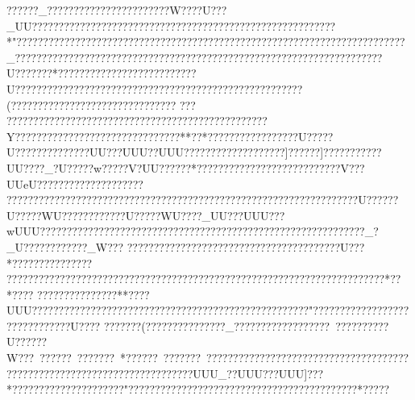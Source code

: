 {{{{{{{{{{{{{{{{{{{{{{{{{{{{{{{{{{{{{{{{{{{{{{{{{{{{{{{{{{{{{{{{{{{{{{{{{{{{{{{{{{{{{{{{{{{{{{{{{{{{{{{{{{{{{{{{{{{{{{{{{{{{{{{{{{{{{{{{{{{{{{{{{{{{{{{{{{{{{{{{{{{{{{{{{{{{{{{{{{{{{{{{{{{{{{{{{{{{{{{{{{{{{{{{{{{{{{{{{{{{{{{{{{{{{{{{{{{{{{{{{{{{{{{{{{{{{{{{{{{{{{{{{{{{{{{{{{{{{{{{{{{{{{{{{{{{{{{{{{{{{{{{{{{{{{{{{{{{{{{{{{{{{{{{{{{{{{{{{{{{{{{{{{{{{{{{{{{{{{{{{{{{{{{{{{{{{{{{{{{{{{{{{{{{{{{{{{{{{{{{{{{{{{{{{{{{{{{{{{{{{{{{{{{{{{{{{{{{{{{{{{{{{{{{{{{{{{{{{{{{{{{{{{{{{{{{{{{{{{{{{{{{{{{{{{{{{{{{{{{{{{{{{{{{{{{{{{{{{{{{{{{{{{{{{{{{{{{{{{{{{{{{{{{{{{{{{{{{{{{{{{{{{{{{{{{{{{{{{{{{{{{{{{{{{{{{{{{{{{{{{{{{{{{{{{{{{{{{{{{{{{{{{{{{{{{{{{{{{{{{{{{{{{{{{{{{{{{{{{{{{{{{{{{{{{{{{{{{{{{{{{{{{{{{{{{{{{{{{{{{{{{{{{{{{{{{{{{{{{{{{{{{{{{{{{{{{{{{{{{{{{{{{{{{{{{{{{{{{{{{{{{{{{{{{{{{{{{{{{{{{{{{{{{{{{{??????_???????????????????????W????U???_UU???  ?????? ????????????????????????????????????????????????*"????  ?????????????????????????????????????????????????????????????????????_?????????????????????????????????????????????????????????????????????U???????*??????????????????????????U?????????????????????????????????????????????????????? (  ????????????   ???????????????????  ???????????????? ????????????????????????????????????Y??????????????????????????????? ** ??*?????????????????U?????U??????????????UU???UUU??UUU???????????????????]??????]???????????UU????_?U?????w???   ??V?UU??????*?????    ????????????????   ??????V???UUeU????   ?????   ?????  ??????  ?????? ??????? ?????????????????????????????????????????????????????U??????U?????WU????????????U?????WU????_UU???UUU???wUUU??   ???  ???? ?????? ??????????????????????????????????????????????_?_U????????????_W??? ???????????????????  ????? ????????????????U???*??????????????????????????????????????????????????????????????????????????????????????*??*???? ? ??????????????**????UUU???? ??????????????????????????????  ??????  ???????? ????   "??????? ??????? ????   ?????   ???????U????
??????? (???????????????_???????????    ????    ???~??????????U??????W???~ ??????~???????~*??????~???????~   ????  ?????????????????????????????????????????????????????????????????   ??    ??UUU_??UUU???UUU]???*?????????????????????  "???? ???????????????????????????????????????*?????   
}}}}}}}}}}}}}}}}}}}}}}}}}}}}}}}}}}}}}}}}}}}}}}}}}}}}}}}}}}}}}}}}}}}}}}}}}}}}}}}}}}}}}}}}}}}}}}}}}}}}}}}}}}}}}}}}}}}}}}}}}}}}}}}}}}}}}}}}}}}}}}}}}}}}}}}}}}}}}}}}}}}}}}}}}}}}}}}}}}}}}}}}}}}}}}}}}}}}}}}}}}}}}}}}}}}}}}}}}}}}}}}}}}}}}}}}}}}}}}}}}}}}}}}}}}}}}}}}}}}}}}}}}}}}}}}}}}}}}}}}}}}}}}}}}}}}}}}}}}}}}}}}}}}}}}}}}}}}}}}}}}}}}}}}}}}}}}}}}}}}}}}}}}}}}}}}}}}}}}}}}}}}}}}}}}}}}}}}}}}}}}}}}}}}}}}}}}}}}}}}}}}}}}}}}}}}}}}}}}}}}}}}}}}}}}}}}}}}}}}}}}}}}}}}}}}}}}}}}}}}}}}}}}}}}}}}}}}}}}}}}}}}}}}}}}}}}}}}}}}}}}}}}}}}}}}}}}}}}}}}}}}}}}}}}}}}}}}}}}}}}}}}}}}}}}}}}}}}}}}}}}}}}}}}}}}}}}}}}}}}}}}}}}}}}}}}}}}}}}}}}}}}}}}}}}}}}}}}}}}}}}}}}}}}}}}}}}}}}}}}}}}}}}}}}}}}}}}}}}}}}}}}}}}}}}}}}}}}}}}}}}}}}}}}}}}}}}}}}}}}}}}}}}}}}}}}}}}}}}}}}}}}}}}}}}}}}}}}}}}}}}}}}}}}}}}}}}}}}}}}}}}}}}}}}}}}}}}}}}}}}}}}}}}}}}}
